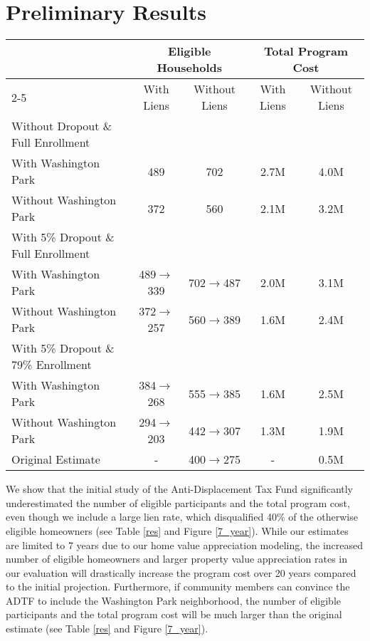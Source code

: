 \documentclass{acm_proc_article-sp}
\begin{document}
\section{Preliminary Results}

\begin{table*}[ht!]
\centering
\begin{tabular}{lcccc}
\toprule
& \multicolumn{2}{c}{Eligible Households} & \multicolumn{2}{c}{Total Program Cost} \\ \cmidrule{2-5}
& With Liens & Without Liens & With Liens & Without Liens                          \\
\midrule
Without Dropout \& Full Enrollment & & & &\\
\midrule
With Washington Park      & 489    & 702    & 2.7M    & 4.0M                              \\
Without Washington Park    & 372  & 560   & 2.1M    & 3.2M                              \\
\midrule
With 5\% Dropout \& Full Enrollment & & & &\\
\midrule                           
With Washington Park & 489$\rightarrow$339  & 702$\rightarrow$487    & 2.0M   & 3.1M                              \\
Without Washington Park   & 372$\rightarrow$257  & 560$\rightarrow$389 & 1.6M  & 2.4M                              \\
\midrule
With 5\% Dropout \& 79\% Enrollment & & & &\\
\midrule                           
With Washington Park & 384$\rightarrow$268  & 555$\rightarrow$385    & 1.6M   & 2.5M                              \\
Without Washington Park   & 294$\rightarrow$203  & 442$\rightarrow$307 & 1.3M  & 1.9M                              \\
Original Estimate & -                                           & 400$\rightarrow$275                                 & -                                       & 0.5M                                \\
\bottomrule
\end{tabular}
\caption{Estimated 7-year costs of the program for different scenarios and the original program cost
estimate \cite{bed17}. The original estimate did not consider liens.}
\label{res}
\end{table*}

We show that the initial study of the Anti-Displacement Tax Fund significantly underestimated the number of eligible participants and the total program cost, even though we include a large lien rate, which disqualified 40\% of the otherwise eligible homeowners (see Table \ref{res} and Figure \ref{7_year}). While our estimates are limited to 7 years due to our home value appreciation modeling, the increased number of eligible homeowners and larger property value appreciation rates in our evaluation will drastically increase the program cost over 20 years compared to the initial projection. Furthermore, if community members can convince the ADTF to include the Washington Park neighborhood, the number of eligible participants and the total program cost will be much larger than the original estimate (see Table \ref{res} and Figure \ref{7_year}).
\end{document}

